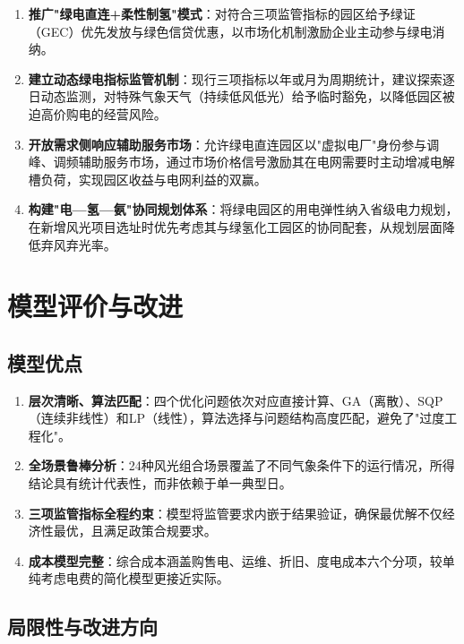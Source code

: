 \documentclass[UTF8,12pt,a4paper]{ctexart}
\begin{document}
\begin{enumerate}[leftmargin=3em, itemsep=0.3em]
  \item \textbf{推广"绿电直连+柔性制氢"模式}：对符合三项监管指标的园区给予绿证（GEC）优先发放与绿色信贷优惠，以市场化机制激励企业主动参与绿电消纳。

  \item \textbf{建立动态绿电指标监管机制}：现行三项指标以年或月为周期统计，建议探索逐日动态监测，对特殊气象天气（持续低风低光）给予临时豁免，以降低园区被迫高价购电的经营风险。

  \item \textbf{开放需求侧响应辅助服务市场}：允许绿电直连园区以"虚拟电厂"身份参与调峰、调频辅助服务市场，通过市场价格信号激励其在电网需要时主动增减电解槽负荷，实现园区收益与电网利益的双赢。

  \item \textbf{构建"电—氢—氨"协同规划体系}：将绿电园区的用电弹性纳入省级电力规划，在新增风光项目选址时优先考虑其与绿氢化工园区的协同配套，从规划层面降低弃风弃光率。
\end{enumerate}

\section{模型评价与改进}

\subsection{模型优点}

\begin{enumerate}[leftmargin=3em, itemsep=0.3em]
  \item \textbf{层次清晰、算法匹配}：四个优化问题依次对应直接计算、GA（离散）、SQP（连续非线性）和LP（线性），算法选择与问题结构高度匹配，避免了"过度工程化"。
  \item \textbf{全场景鲁棒分析}：24种风光组合场景覆盖了不同气象条件下的运行情况，所得结论具有统计代表性，而非依赖于单一典型日。
  \item \textbf{三项监管指标全程约束}：模型将监管要求内嵌于结果验证，确保最优解不仅经济性最优，且满足政策合规要求。
  \item \textbf{成本模型完整}：综合成本涵盖购售电、运维、折旧、度电成本六个分项，较单纯考虑电费的简化模型更接近实际。
\end{enumerate}

\subsection{局限性与改进方向}
\end{document}
